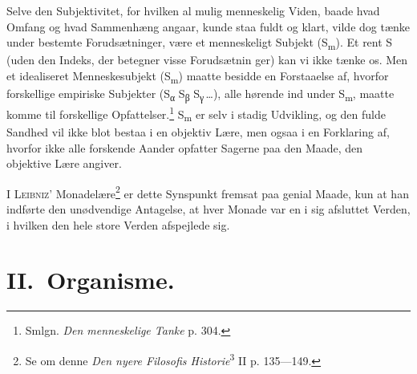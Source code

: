 \documentclass[12pt]{article}
\newcommand{\opage}[1]{\marginnote{\footnotesize\textit{[#1]}}}
\begin{document}
Selve den Subjektivitet, for hvilken al mulig menneskelig Viden, baade
hvad Omfang og hvad Sammenhæng angaar, kunde staa fuldt og klart,
vilde dog tænke under bestemte Forudsætninger, være et menneskeligt
Subjekt (S\textsubscript{m}). Et rent S (uden den Indeks, der betegner
visse Forudsætnin%
\setcounter{footnote}{0}%
\opage{20}ger) kan vi ikke tænke os. Men et idealiseret Menneskesubjekt
(S\textsubscript{m}) maatte besidde en Forstaaelse af, hvorfor
forskellige empiriske Subjekter (S\textsubscript{α} S\textsubscript{β}
S\textsubscript{γ}\,\dots), alle hørende ind under S\textsubscript{m},
maatte komme til forskellige Opfattelser.\footnote{Smlgn. \textit{Den
menneskelige Tanke} p. 304.} S\textsubscript{m} er selv i stadig
Udvikling, og den fulde Sandhed vil ikke blot bestaa i en objektiv
Lære, men ogsaa i en Forklaring af, hvorfor ikke alle forskende Aander
opfatter Sagerne paa den Maade, den objektive Lære angiver.

I \textsc{Leibniz}' Monadelære\footnote{Se om denne \textit{Den nyere
Filosofis Historie}\textsuperscript{3} II p. 135---149.} er dette
Synspunkt fremsat paa genial Maade, kun at han indførte den
unødvendige Antagelse, at hver Monade var en i sig afsluttet Verden, i
hvilken den hele store Verden afspejlede sig.

\section*{II.\ Organisme.}
\end{document}
